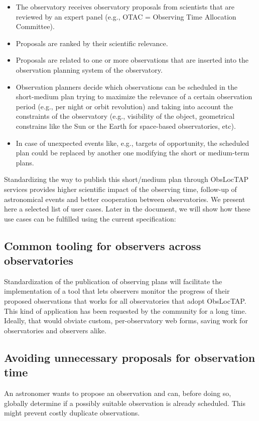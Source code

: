 \documentclass[11pt,a4paper]{ivoa}
\begin{document}
\begin{itemize}
	\item The observatory receives observatory proposals from scientists that are reviewed by an expert panel (e.g., OTAC = Observing Time Allocation Committee). \par

	\item Proposals are ranked by their scientific relevance.

	\item Proposals are related to one or more observations that are inserted into the observation planning system of the observatory.

	\item Observation planners decide which observations can be scheduled in the short-medium plan trying to maximize the relevance of a certain observation period (e.g., per night or orbit revolution) and taking into account the constraints of the observatory (e.g., visibility of the object, geometrical constrains like the Sun or the Earth for space-based observatories, etc).

	\item In case of unexpected events like, e.g., targets of opportunity, the scheduled plan could be replaced by another one modifying the short or medium-term plans.
\end{itemize}

Standardizing the way to publish this short/medium plan through ObsLocTAP services provides higher scientific impact of the observing time, follow-up of astronomical events and better cooperation between observatories. We present here a selected list of user cases. Later in the document, we will show how these use cases can be fulfilled using the current specification:

\subsection{Common tooling for observers across observatories}
Standardization of the publication of observing plans will facilitate the implementation of a tool that lets observers monitor the progress of their proposed observations that works for all observatories that adopt ObsLocTAP. This kind of application has been requested by the community for a long time. Ideally, that would obviate custom, per-observatory web forms, saving work for observatories and observers alike. 

\subsection{Avoiding unnecessary proposals for observation time}
An astronomer wants to propose an observation and can, before doing so, globally determine if a possibly suitable observation is already scheduled.  This might prevent costly duplicate observations. 
\end{document}
